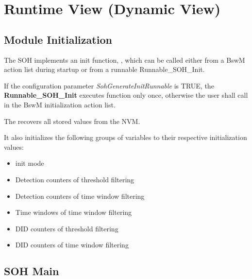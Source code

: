 \chapter{Runtime View (Dynamic View)}

\section{Module Initialization}
\label{sec:init}

{
The SOH implements an init function, , which can be called either from a BswM action list during
startup or from a runnable Runnable_SOH_Init.
}{
}

{
If the configuration parameter \textit{SohGenerateInitRunnable} is TRUE, the \textbf{Runnable_SOH_Init} executes  function only once, otherwise the user shall call  in the BswM initialization action list.
}
{
}




{
The  recovers all stored values from the NVM.
}{
 
}


{
It also initializes the following groups of variables to their respective initialization values:
\begin{itemize}
\item {} init mode
\item Detection counters of threshold filtering
\item Detection counters of time window filtering
\item Time windows of time window filtering
\item DID counters of threshold filtering
\item DID counters of time window  filtering
\end{itemize}
}
{
}

\section{SOH Main}\label{sec:sohmain}

